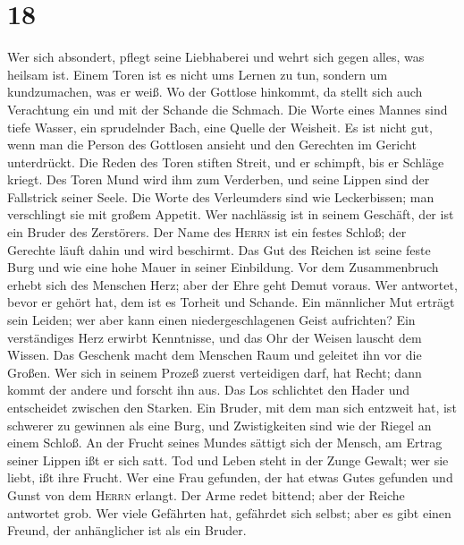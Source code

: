 \hypertarget{section-17}{%
\section{18}\label{section-17}}

 Wer sich absondert, pflegt seine Liebhaberei und wehrt
sich gegen alles, was heilsam ist.  Einem Toren ist es
nicht ums Lernen zu tun, sondern um kundzumachen, was er weiß.
 Wo der Gottlose hinkommt, da stellt sich auch Verachtung
ein und mit der Schande die Schmach.  Die Worte eines
Mannes sind tiefe Wasser, ein sprudelnder Bach, eine Quelle der
Weisheit.  Es ist nicht gut, wenn man die Person des
Gottlosen ansieht und den Gerechten im Gericht unterdrückt.
 Die Reden des Toren stiften Streit, und er schimpft, bis
er Schläge kriegt.  Des Toren Mund wird ihm zum Verderben,
und seine Lippen sind der Fallstrick seiner Seele.  Die
Worte des Verleumders sind wie Leckerbissen; man verschlingt sie mit
großem Appetit.  Wer nachlässig ist in seinem Geschäft,
der ist ein Bruder des Zerstörers.  Der Name des
\textsc{Herrn} ist ein festes Schloß; der Gerechte läuft dahin und wird
beschirmt.  Das Gut des Reichen ist seine feste Burg und
wie eine hohe Mauer in seiner Einbildung.  Vor dem
Zusammenbruch erhebt sich des Menschen Herz; aber der Ehre geht Demut
voraus.  Wer antwortet, bevor er gehört hat, dem ist es
Torheit und Schande.  Ein männlicher Mut erträgt sein
Leiden; wer aber kann einen niedergeschlagenen Geist aufrichten?
 Ein verständiges Herz erwirbt Kenntnisse, und das Ohr
der Weisen lauscht dem Wissen.  Das Geschenk macht dem
Menschen Raum und geleitet ihn vor die Großen.  Wer sich
in seinem Prozeß zuerst verteidigen darf, hat Recht; dann kommt der
andere und forscht ihn aus.  Das Los schlichtet den Hader
und entscheidet zwischen den Starken.  Ein Bruder, mit
dem man sich entzweit hat, ist schwerer zu gewinnen als eine Burg, und
Zwistigkeiten sind wie der Riegel an einem Schloß.  An
der Frucht seines Mundes sättigt sich der Mensch, am Ertrag seiner
Lippen ißt er sich satt.  Tod und Leben steht in der
Zunge Gewalt; wer sie liebt, ißt ihre Frucht.  Wer eine
Frau gefunden, der hat etwas Gutes gefunden und Gunst von dem
\textsc{Herrn} erlangt.  Der Arme redet bittend; aber der
Reiche antwortet grob.  Wer viele Gefährten hat,
gefährdet sich selbst; aber es gibt einen Freund, der anhänglicher ist
als ein Bruder.

